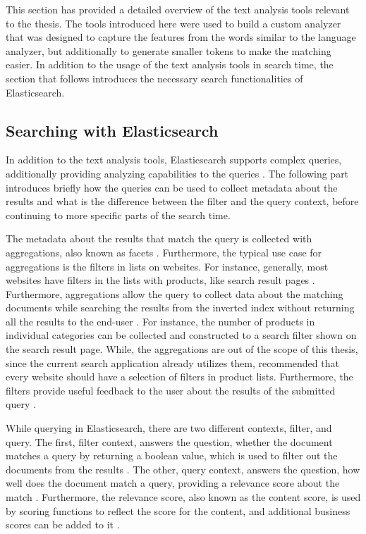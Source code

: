This section has provided a detailed overview of the text analysis tools relevant to the thesis.
The tools introduced here were used to build a custom analyzer that was designed to capture 
the features from the words similar to the language analyzer, but additionally to generate smaller tokens
to make the matching easier.
In addition to the usage of the text analysis tools in search time,
the section that follows introduces the necessary search functionalities of Elasticsearch.


\subsection{Searching with Elasticsearch}
\label{ss:searchElasticsearch}


In addition to the text analysis tools, Elasticsearch supports complex queries, additionally providing
analyzing capabilities to the queries \cite{elasticIntro}.
The following part introduces briefly how the queries can be used to collect metadata about the results 
and what is the difference between the filter and the query context, 
before continuing to more specific parts of the search time.


The metadata about the results that match the query is collected with aggregations, 
also known as facets \cite{elasticIntro}.
Furthermore, the typical use case for aggregations is the filters in lists on websites.
For instance, generally, most websites have filters in the lists with products, 
like search result pages \cite{relevantSearch}.
Furthermore, aggregations allow the query to collect data about the matching documents 
while searching the results from the inverted index without returning all the results to 
the end-user \cite{relevantSearch}.
For instance, the number of products in individual categories can be collected and constructed to 
a search filter shown on the search result page.
While, the aggregations are out of the scope of this thesis, since the current search application already
utilizes them, \citeauthor{relevantSearch} \cite{relevantSearch} recommended that every website should have
a selection of filters in product lists.
Furthermore, the filters provide useful feedback to the user about
the results of the submitted query \cite{relevantSearch}.


While querying in Elasticsearch, there are two different contexts, filter, and query. 
The first, filter context, answers the question, whether the document matches a query
by returning a boolean value, which is used to filter out the documents from the results \cite{elasticIntro}.
The other, query context, answers the question, how well does the document match a query,
providing a relevance score about the match \cite{elasticIntro}.
Furthermore, the relevance score, also known as the content score, is used by scoring functions
to reflect the score for the content, and additional business scores can be added to it \cite{elasticIntro}.


